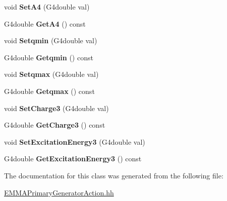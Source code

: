 \begin{DoxyCompactItemize}
\item 
\hypertarget{classEMMAPrimaryGeneratorAction_a26d5ea23732eab9764542ad00586d73d}{void {\bfseries Set\-A4} (G4double val)}\label{classEMMAPrimaryGeneratorAction_a26d5ea23732eab9764542ad00586d73d}

\item 
\hypertarget{classEMMAPrimaryGeneratorAction_a76ad6ae5c4822c34c915722f85ef2296}{G4double {\bfseries Get\-A4} () const }\label{classEMMAPrimaryGeneratorAction_a76ad6ae5c4822c34c915722f85ef2296}

\item 
\hypertarget{classEMMAPrimaryGeneratorAction_a32f34adbde9466059229d79987a92eb1}{void {\bfseries Setqmin} (G4double val)}\label{classEMMAPrimaryGeneratorAction_a32f34adbde9466059229d79987a92eb1}

\item 
\hypertarget{classEMMAPrimaryGeneratorAction_a06928525e796032bf0ed6d1a4f4ee88c}{G4double {\bfseries Getqmin} () const }\label{classEMMAPrimaryGeneratorAction_a06928525e796032bf0ed6d1a4f4ee88c}

\item 
\hypertarget{classEMMAPrimaryGeneratorAction_a55647c25d00289769a328b938005334c}{void {\bfseries Setqmax} (G4double val)}\label{classEMMAPrimaryGeneratorAction_a55647c25d00289769a328b938005334c}

\item 
\hypertarget{classEMMAPrimaryGeneratorAction_ab2da8d263f1ff996856f951c64a754a8}{G4double {\bfseries Getqmax} () const }\label{classEMMAPrimaryGeneratorAction_ab2da8d263f1ff996856f951c64a754a8}

\item 
\hypertarget{classEMMAPrimaryGeneratorAction_a075b821b81088346405bb3c8e596cd8f}{void {\bfseries Set\-Charge3} (G4double val)}\label{classEMMAPrimaryGeneratorAction_a075b821b81088346405bb3c8e596cd8f}

\item 
\hypertarget{classEMMAPrimaryGeneratorAction_aba253bcca3d2f14bbb92a0910ba7439c}{G4double {\bfseries Get\-Charge3} () const }\label{classEMMAPrimaryGeneratorAction_aba253bcca3d2f14bbb92a0910ba7439c}

\item 
\hypertarget{classEMMAPrimaryGeneratorAction_a1b9cf54f2ccda6e634203a198a796dfc}{void {\bfseries Set\-Excitation\-Energy3} (G4double val)}\label{classEMMAPrimaryGeneratorAction_a1b9cf54f2ccda6e634203a198a796dfc}

\item 
\hypertarget{classEMMAPrimaryGeneratorAction_a83e01c94255f470b3e6d88f2ffc9d019}{G4double {\bfseries Get\-Excitation\-Energy3} () const }\label{classEMMAPrimaryGeneratorAction_a83e01c94255f470b3e6d88f2ffc9d019}

\end{DoxyCompactItemize}


The documentation for this class was generated from the following file\-:\begin{DoxyCompactItemize}
\item 
\hyperlink{EMMAPrimaryGeneratorAction_8hh}{E\-M\-M\-A\-Primary\-Generator\-Action.\-hh}\end{DoxyCompactItemize}
